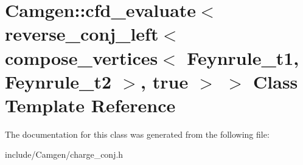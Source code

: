 \hypertarget{a00064}{\section{Camgen\-:\-:cfd\-\_\-evaluate$<$ reverse\-\_\-conj\-\_\-left$<$ compose\-\_\-vertices$<$ Feynrule\-\_\-t1, Feynrule\-\_\-t2 $>$, true $>$ $>$ Class Template Reference}
\label{a00064}
}


The documentation for this class was generated from the following file\-:\begin{DoxyCompactItemize}
\item 
include/\-Camgen/charge\-\_\-conj.\-h\end{DoxyCompactItemize}
